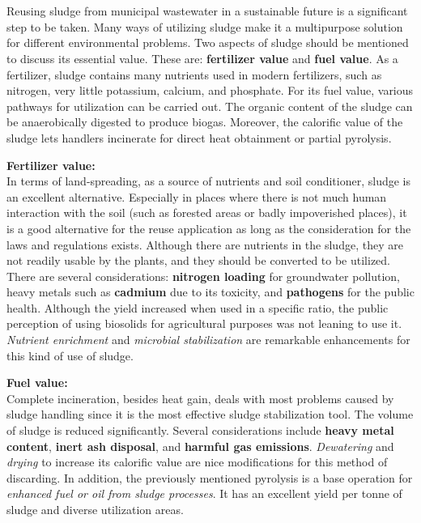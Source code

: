 \documentclass[a4paper]{article}
\begin{document}
\section{} %
Reusing sludge from municipal wastewater in a sustainable future is a significant step to be taken\autocite{Vilakazi2023, Tarpani2023}. Many ways of utilizing sludge make it a multipurpose solution for different environmental problems. Two aspects of sludge should be mentioned to discuss its essential value. These are: \textbf{fertilizer value} and \textbf{fuel value}. As a fertilizer, sludge contains many nutrients used in modern fertilizers, such as nitrogen, very little potassium, calcium, and phosphate\autocite{Vilakazi2023, sanin2011}. For its fuel value, various pathways for utilization can be carried out. The organic content of the sludge can be anaerobically digested to produce biogas. Moreover, the calorific value of the sludge lets handlers incinerate for direct heat obtainment or partial pyrolysis\autocite{vesilind1988}.\\
\begin{minipage}[c]{0.5\textwidth}
    \medskip
    \textbf{Fertilizer value:}\\
    In terms of land-spreading, as a source of nutrients and soil conditioner, sludge is an excellent alternative. Especially in places where there is not much human interaction with the soil (such as forested areas or badly impoverished places), it is a good alternative for the reuse application as long as the consideration for the laws and regulations exists\autocite{vesilind1988}. Although there are nutrients in the sludge, they are not readily usable by the plants, and they should be converted to be utilized. There are several considerations: \textbf{nitrogen loading} for groundwater pollution, heavy metals such as \textbf{cadmium} due to its toxicity, and \textbf{pathogens} for the public health\autocite{vesilind1988}. Although the yield increased when used in a specific ratio, the public perception of using biosolids for agricultural purposes was not leaning to use it\autocite{sanin2011}. \textit{Nutrient enrichment} and \textit{microbial stabilization} are remarkable enhancements for this kind of use of sludge.
\end{minipage}
\hfill
\begin{minipage}{0.45\textwidth}
    \textbf{Fuel value:}\\
    Complete incineration, besides heat gain, deals with most problems caused by sludge handling since it is the most effective sludge stabilization tool\autocite{vesilind1988}. The volume of sludge is reduced significantly. Several considerations include \textbf{heavy metal content}, \textbf{inert ash disposal}, and \textbf{harmful gas emissions}. \textit{Dewatering} and \textit{drying} to increase its calorific value are nice modifications for this method of discarding. In addition, the previously mentioned pyrolysis is a base operation for \textit{enhanced fuel or oil from sludge processes}\autocite{sanin2011}. It has an excellent yield per tonne of sludge and diverse utilization areas.
\end{minipage}
\end{document}
